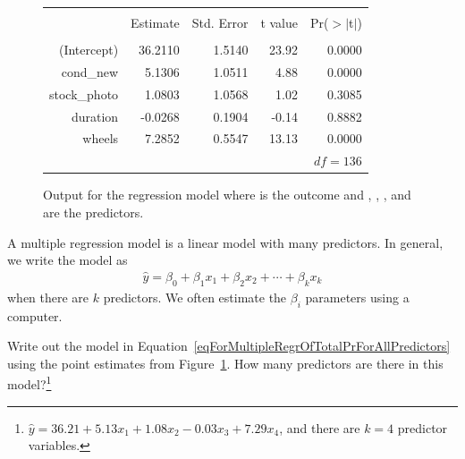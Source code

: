 \begin{figure}[ht]
\centering
\begin{tabular}{rrrrr}
  \hline
  \vspace{-3.7mm} & & & & \\
 & Estimate & Std. Error & t value & Pr($>$$|$t$|$) \\ 
  \hline
  \vspace{-3.8mm} & & & & \\
(Intercept) & 36.2110 & 1.5140 & 23.92 & 0.0000 \\ 
  cond\_\hspace{0.3mm}new & 5.1306 & 1.0511 & 4.88 & 0.0000 \\ 
  stock\_\hspace{0.3mm}photo & 1.0803 & 1.0568 & 1.02 & 0.3085 \\ 
  duration & -0.0268 & 0.1904 & -0.14 & 0.8882 \\ 
  wheels & 7.2852 & 0.5547 & 13.13 & 0.0000 \\ 
   \hline
   &&&\multicolumn{2}{r}{$df=136$}
\end{tabular}
\caption{Output for the regression model where  is the outcome and , , , and  are the predictors.}
\label{outputForMultipleRegrOutputForAllPredictors}
\end{figure}

\begin{termBox}{
A multiple regression model is a linear model with many predictors. In general, we write the model as
\begin{align*}
\hat{y} = \beta_0 + \beta_1 x_1 + \beta_2 x_2 + \cdots + \beta_k x_k %
\end{align*}
when there are $k$ predictors. We often estimate the $\beta_i$ parameters using a computer.\vspace{1mm}}
\end{termBox}

\begin{exercise} \label{eqForMultipleRegrOfTotalPrForAllPredictorsWithCoefficients}
Write out the model in Equation~\eqref{eqForMultipleRegrOfTotalPrForAllPredictors} using the point estimates from Figure~\ref{outputForMultipleRegrOutputForAllPredictors}. How many predictors are there in this model?\footnote{$\hat{y} = 36.21 + 5.13x_1 + 1.08x_2 - 0.03x_3 + 7.29x_4$, and there are $k=4$ predictor variables.}
\end{exercise}

